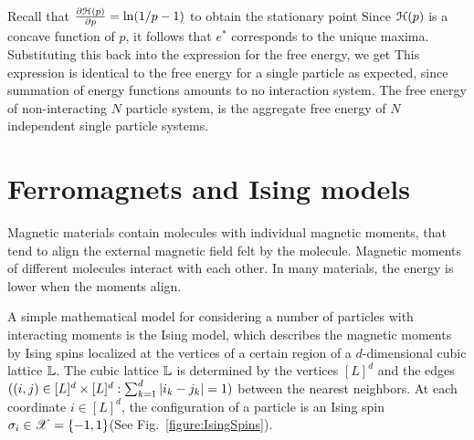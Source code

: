 \documentclass[letterpaper,english,10pt]{article}
\begin{document}
\begin{shaded*}
\begin{exmp}
Recall that $\frac{\partial \mathcal{H}(p) }{\partial p} = \ln(1/p-1)$ to obtain the stationary point
Since $\mathcal{H}(p)$ is a concave function of $p$, it follows that $e^{\ast}$ corresponds to the unique maxima. %
Substituting this back into the expression for the free energy, we get 
This expression is identical to the free energy for a single particle as expected, 
since summation of energy functions amounts to no interaction system. 
The free energy of non-interacting $N$ particle system, is the aggregate free energy of $N$ independent single particle systems. 
\end{exmp}
\end{shaded*}

\section{Ferromagnets and Ising models}
Magnetic materials contain molecules with individual magnetic moments, that tend to align the external magnetic field felt by the molecule. 
Magnetic moments of different molecules interact with each other. 
In many materials, the energy is lower when the moments align. 

A simple mathematical model for considering a number of particles with interacting moments is the Ising model, which describes the magnetic moments by Ising spins localized at the vertices of a certain region of a $d$-dimensional cubic lattice $\mathbb{L}$. 
The cubic lattice $\mathbb{L}$ is determined by the vertices $[L]^d$ and the edges $((i,j) \in [L]^d \times [L]^d: \sum_{k=1}^d\left\lvert i_k-j_k\right\rvert = 1)$ between the nearest neighbors.  
At each coordinate $i \in [L]^d$, the configuration of a particle is an Ising spin $\sigma_i \in \mathscr{X} = \{-1,1\}$(See Fig.~\ref{figure:IsingSpins}). 
\end{document}
